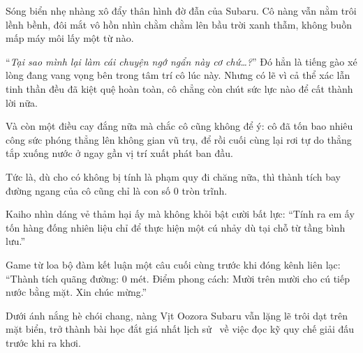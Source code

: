 \documentclass[../main.tex]{subfiles}
\begin{document}
Sóng biển nhẹ nhàng xô đẩy thân hình đờ đẫn của Subaru. Cô nàng vẫn nằm trôi lềnh bềnh, đôi mắt vô hồn nhìn chằm chằm lên bầu trời xanh thẫm, không buồn mấp máy môi lấy một từ nào.


``\textit{Tại sao mình lại làm cái chuyện ngớ ngẩn này cơ chứ\dots?}'' Đó hẳn là tiếng gào xé lòng đang vang vọng bên trong tâm trí cô lúc này. Nhưng có lẽ vì cả thể xác lẫn tinh thần đều đã kiệt quệ hoàn toàn, cô chẳng còn chút sức lực nào để cất thành lời nữa.

Và còn một điều cay đắng nữa mà chắc cô cũng không để ý: cô đã tốn bao nhiêu công sức phóng thẳng lên không gian vũ trụ, để rồi cuối cùng lại rơi tự do thẳng tắp xuống nước ở ngay gần vị trí xuất phát ban đầu.

Tức là, dù cho có không bị tính là phạm quy đi chăng nữa, thì thành tích bay đường ngang của cô cũng chỉ là con số 0 tròn trĩnh.

Kaiho nhìn dáng vẻ thảm hại ấy mà không khỏi bật cười bất lực: ``Tính ra em ấy tốn hàng đống nhiên liệu chỉ để thực hiện một cú nhảy dù tại chỗ từ tầng bình lưu.''

Game từ loa bộ đàm kết luận một câu cuối cùng trước khi đóng kênh liên lạc: ``Thành tích quãng đường: 0 mét. Điểm phong cách: Mười trên mười cho cú tiếp nước bằng mặt. Xin chúc mừng.''

Dưới ánh nắng hè chói chang, nàng Vịt Oozora Subaru vẫn lặng lẽ trôi dạt trên mặt biển, trở thành bài học đắt giá nhất lịch sử \hll\ về việc đọc kỹ quy chế giải đấu trước khi ra khơi.
\end{document}
